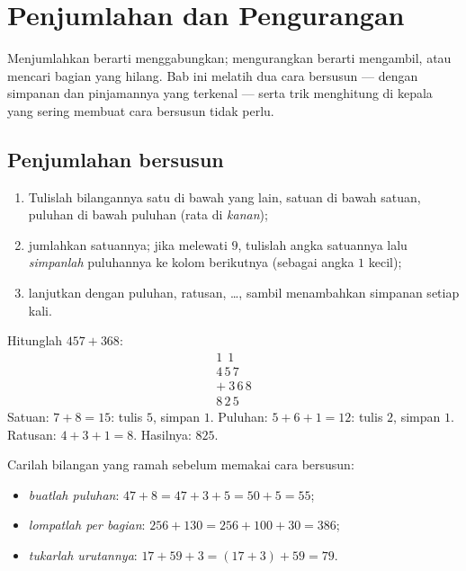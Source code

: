 \chapter{Penjumlahan dan Pengurangan}\label{ch:g3:addsub}

Menjumlahkan berarti menggabungkan; mengurangkan berarti mengambil,
atau mencari bagian yang hilang. Bab ini melatih dua cara bersusun
--- dengan simpanan dan pinjamannya yang terkenal --- serta trik
menghitung di kepala yang sering membuat cara bersusun tidak perlu.

\section{Penjumlahan bersusun}

\begin{method}\label{met:g3:addsub:add}
\begin{enumerate}
  \item Tulislah bilangannya satu di bawah yang lain, satuan di bawah
        satuan, puluhan di bawah puluhan (rata di \emph{kanan});
  \item jumlahkan satuannya; jika  melewati $9$, tulislah
        angka satuannya lalu \emph{simpanlah} puluhannya ke kolom
        berikutnya (sebagai angka $1$ kecil);
  \item lanjutkan dengan puluhan, ratusan, \dots, sambil menambahkan
        simpanan setiap kali.
\end{enumerate}
\end{method}

\begin{example}\label{ex:g3:addsub:add}
Hitunglah $457 + 368$:
\[
\begin{array}{r}
{\scriptstyle 1}\ \ {\scriptstyle 1}\ \ \phantom{0} \\[-3pt]
4\,5\,7 \\
+\ 3\,6\,8 \\
\hline
8\,2\,5
\end{array}
\]
Satuan: $7 + 8 = 15$: tulis $5$, simpan $1$. Puluhan:
$5 + 6 + 1 = 12$: tulis $2$, simpan $1$. Ratusan: $4 + 3 + 1 = 8$.
Hasilnya: $825$.
\end{example}

\begin{example}\label{ex:g3:addsub:mental}
Carilah bilangan yang ramah sebelum memakai cara bersusun:
\begin{itemize}
  \item \emph{buatlah puluhan}: $47 + 8 = 47 + 3 + 5 = 50 + 5 = 55$;
  \item \emph{lompatlah per bagian}: $256 + 130 = 256 + 100 + 30 = 386$;
  \item \emph{tukarlah urutannya}: $17 + 59 + 3 = (17 + 3) + 59 = 79$.
\end{itemize}
\end{example}

